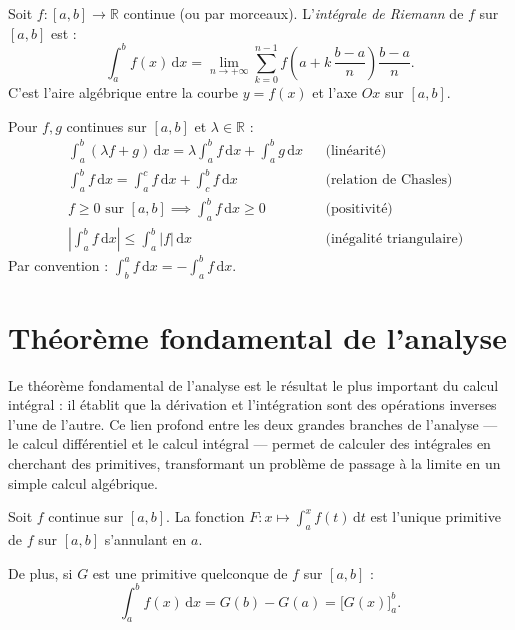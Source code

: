 \documentclass[11pt,a4paper,twoside]{book}
\newcommand{\R}{\mathbb{R}}
\begin{document}
\begin{definitionbox}
Soit $f : [a,b] \to \R$ continue (ou par morceaux). L'\emph{intégrale de Riemann} de $f$ sur $[a,b]$ est :
\[
  \int_a^b f(x)\,\mathrm{d}x = \lim_{n\to+\infty} \sum_{k=0}^{n-1} f\!\left(a+k\,\frac{b-a}{n}\right)\frac{b-a}{n}.
\]
C'est l'aire algébrique entre la courbe $y=f(x)$ et l'axe $Ox$ sur $[a,b]$.
\end{definitionbox}

\begin{theoremebox}
Pour $f, g$ continues sur $[a,b]$ et $\lambda \in \R$ :
\begin{align*}
  &\int_a^b (\lambda f+g)\,\mathrm{d}x = \lambda\int_a^b f\,\mathrm{d}x + \int_a^b g\,\mathrm{d}x & &\text{(linéarité)} \\
  &\int_a^b f\,\mathrm{d}x = \int_a^c f\,\mathrm{d}x + \int_c^b f\,\mathrm{d}x & &\text{(relation de Chasles)} \\
  &f \geq 0 \text{ sur } [a,b] \implies \int_a^b f\,\mathrm{d}x \geq 0 & &\text{(positivité)} \\
  &\left|\int_a^b f\,\mathrm{d}x\right| \leq \int_a^b |f|\,\mathrm{d}x & &\text{(inégalité triangulaire)}
\end{align*}
Par convention : $\int_b^a f\,\mathrm{d}x = -\int_a^b f\,\mathrm{d}x$.
\end{theoremebox}

\section{Théorème fondamental de l'analyse}

Le théorème fondamental de l'analyse est le résultat le plus important du calcul intégral : il établit que la dérivation et l'intégration sont des opérations inverses l'une de l'autre. Ce lien profond entre les deux grandes branches de l'analyse — le calcul différentiel et le calcul intégral — permet de calculer des intégrales en cherchant des primitives, transformant un problème de passage à la limite en un simple calcul algébrique.

\begin{theoremebox}
Soit $f$ continue sur $[a,b]$. La fonction $F : x \mapsto \displaystyle\int_a^x f(t)\,\mathrm{d}t$ est l'unique primitive de $f$ sur $[a,b]$ s'annulant en $a$.

De plus, si $G$ est une primitive quelconque de $f$ sur $[a,b]$ :
\[
  \int_a^b f(x)\,\mathrm{d}x = G(b) - G(a) = \big[G(x)\big]_a^b.
\]
\end{theoremebox}
\end{document}
